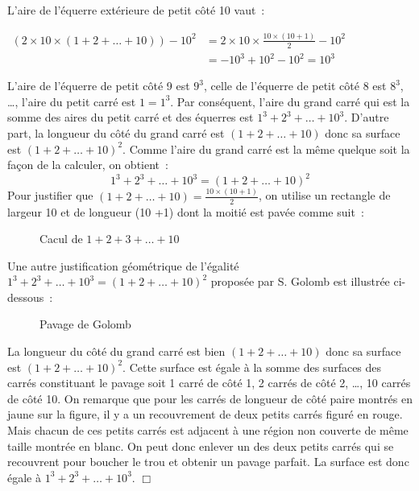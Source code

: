 \begin{corrige}
{\noindent L'aire de l'équerre extérieure de petit côté 10 vaut~:
\begin{center}
$\begin{array}{ll}
(2 \times 10 \times (1 + 2 + \ldots + 10))  - 10^{2} & = 2 \times 10 \times \frac{10 \times (10 +1)}{2} - 10^{2}\\
& = -10^{3} + 10^{2} - 10^{2} = 10^{3}
\end{array}$
\end{center}
L'aire de l'équerre de petit côté 9 est $9^{3}$, celle de l'équerre de petit côté 8 est $8^{3}$,  \ldots, 
l'aire du petit carré est $1 = 1^{3}$. 
Par conséquent, l'aire du grand carré qui
est la somme des aires du petit carré et des équerres est $1^{3} + 2^{3} + \ldots + 10^{3}$.
D'autre part, la longueur du côté du grand carré est $(1 + 2 + \ldots + 10)$ donc sa surface est
$(1 + 2 + \ldots + 10)^{2}$. Comme l'aire du grand carré est la même quelque soit la façon 
de la calculer, on obtient~:
\[ 1^{3} + 2^{3} + \ldots + 10^{3} = (1 + 2 + \ldots + 10)^{2}\]
Pour justifier que $(1 + 2 + \ldots + 10) = \frac{10 \times (10 +1)}{2}$, on utilise un rectangle de
largeur 10 et de longueur  (10 +1) dont la moitié est pavée comme suit~:

\begin{figure}[htbp]
 \caption{Cacul de $1 + 2 + 3 + \ldots + 10$}
\end{figure}

Une autre justification géométrique de l'égalité 
$1^{3} + 2^{3} + \ldots + 10^{3} = (1 + 2 + \ldots + 10)^{2}$ proposée par S. Go\-lomb
\cite{golomb1} est illustrée ci-dessous~: 

\begin{figure}[htbp]
 \caption{Pavage de Golomb}
 \label{fig:golomb}
\end{figure}

\noindent La longueur du côté du grand carré est bien $(1 + 2 + \ldots + 10)$ donc sa surface est
$(1 + 2 + \ldots + 10)^{2}$. Cette surface est égale à la somme des surfaces des carrés
constituant le pavage soit 1 carré de côté 1, 2 carrés de côté 2, \ldots, 10
carrés de côté 10. On 
remarque que pour les carrés de longueur de côté paire montrés en jaune sur la figure, 
il y a un 
recouvrement de deux petits carrés figuré en rouge. Mais chacun de ces petits carrés 
est adjacent à une région non couverte de même taille montrée en blanc. On peut donc
enlever un des deux petits carrés qui se recouvrent pour boucher le trou et obtenir un pavage parfait.
 La surface est donc égale à $1^{3} + 2^{3} + \ldots + 10^{3}$. 
\noindent $\Box$}\end{corrige}

